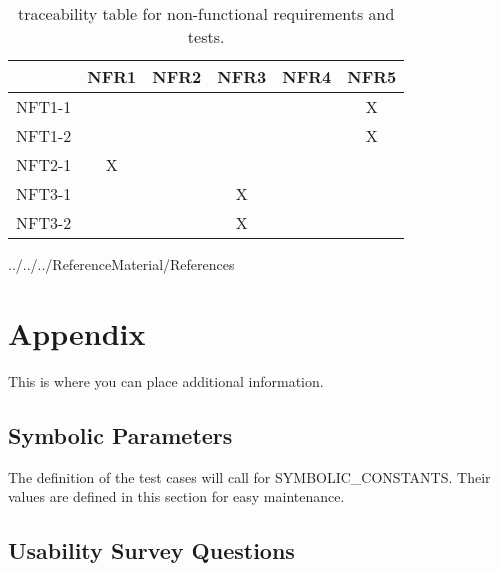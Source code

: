 \documentclass[12pt, titlepage]{article}
\begin{document}
\begin{table}[H]
	\begin{center}
	\begin{tabular}{|l|c|c|c|c|c|}
		\hline
		& NFR1 & NFR2 & NFR3 & NFR4 & NFR5 \\
		\hline
		NFT1-1 &      &      &      &      & X    \\
		\hline
		NFT1-2  &      &      &      &      & X    \\
		\hline
		NFT2-1 & X    &      &      &      &      \\
		\hline
		NFT3-1 &      &      & X    &      &      \\
		\hline
		NFT3-2 &      &      & X    &      &     \\
		\hline
	\end{tabular}
\end{center}
\caption{traceability table for non-functional requirements and tests.}
\end{table}



 {../../../ReferenceMaterial/References}

\newpage

\section{Appendix}

This is where you can place additional information.

\subsection{Symbolic Parameters}

The definition of the test cases will call for SYMBOLIC\_CONSTANTS.
Their values are defined in this section for easy maintenance.

\subsection{Usability Survey Questions} \label{survey}
\end{document}
